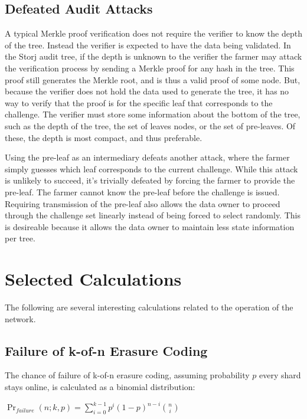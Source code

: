 \documentclass[a4paper,10pt]{article}
\begin{document}
\subsection{Defeated Audit Attacks}
A typical Merkle proof verification does not require the verifier to know the
depth of the tree. Instead the verifier is expected to have the data being
validated. In the Storj audit tree, if the depth is unknown to the verifier the
farmer may attack the verification process by sending a Merkle proof for any
hash in the tree. This proof still generates the Merkle root, and is thus a
valid proof of some node. But, because the verifier does not hold the data used
to generate the tree, it has no way to verify that the proof is for the specific
leaf that corresponds to the challenge. The verifier must store some information
about the bottom of the tree, such as the depth of the tree, the set of leaves
nodes, or the set of pre-leaves. Of these, the depth is most compact, and thus
preferable.

Using the pre-leaf as an intermediary defeats another attack, where the farmer
simply guesses which leaf corresponds to the current challenge. While this
attack is unlikely to succeed, it’s trivially defeated by forcing the farmer to
provide the pre-leaf. The farmer cannot know the pre-leaf before the challenge
is issued. Requiring transmission of the pre-leaf also allows the data owner to
proceed through the challenge set linearly instead of being forced to select
randomly. This is desireable because it allows the data owner to maintain less
state information per tree.

\section{Selected Calculations}
The following are several interesting calculations related to the operation of
the network.

\subsection{Failure of k-of-n Erasure Coding}
The chance of failure of k-of-n erasure coding, assuming probability $ p $ every
shard stays online, is calculated as a binomial distribution:

{\centering
$\Pr_{failure}(n; k,p) = \displaystyle \sum_{i=0}^{k-1} p^{i}(1-p)^{n-i}{n
\choose i}$
\\}
\end{document}
